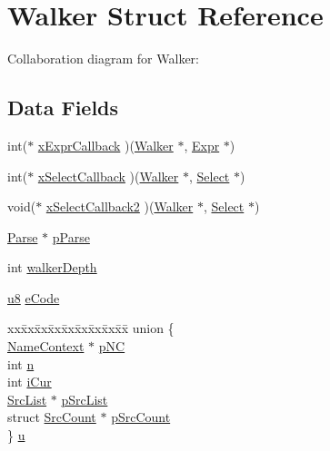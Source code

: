 \hypertarget{struct_walker}{}\section{Walker Struct Reference}
\label{struct_walker}


Collaboration diagram for Walker\+:
\subsection*{Data Fields}
\begin{DoxyCompactItemize}
\item 
int($\ast$ \hyperlink{struct_walker_adf159f38811f6fceaaec334f81ca930f}{x\+Expr\+Callback} )(\hyperlink{struct_walker}{Walker} $\ast$, \hyperlink{struct_expr}{Expr} $\ast$)
\item 
int($\ast$ \hyperlink{struct_walker_a0e113b69b77d7c738f56b35bfa223e3b}{x\+Select\+Callback} )(\hyperlink{struct_walker}{Walker} $\ast$, \hyperlink{struct_select}{Select} $\ast$)
\item 
void($\ast$ \hyperlink{struct_walker_af47ca3398892c8e1b77ecfec55854383}{x\+Select\+Callback2} )(\hyperlink{struct_walker}{Walker} $\ast$, \hyperlink{struct_select}{Select} $\ast$)
\item 
\hyperlink{struct_parse}{Parse} $\ast$ \hyperlink{struct_walker_ac700bf257b32cd7e491fde90a081379d}{p\+Parse}
\item 
int \hyperlink{struct_walker_a3408c16f995f9fbf7a7f0199b3e6658c}{walker\+Depth}
\item 
\hyperlink{sqlite3_8c_a74a0f6424ae628af25f23f0a35f6ead3}{u8} \hyperlink{struct_walker_a9722ca12532d3d55b851ac6f586c51a2}{e\+Code}
\item 
\begin{tabbing}
xx\=xx\=xx\=xx\=xx\=xx\=xx\=xx\=xx\=\kill
union \{\\
\>\hyperlink{struct_name_context}{NameContext} $\ast$ \hyperlink{struct_walker_ab8e4596de9a977e3a52462ae8d1f7b7a}{pNC}\\
\>int \hyperlink{struct_walker_a76f11d9a0a47b94f72c2d0e77fb32240}{n}\\
\>int \hyperlink{struct_walker_ad4234df4b7f768520fbd6a92a2b0023c}{iCur}\\
\>\hyperlink{struct_src_list}{SrcList} $\ast$ \hyperlink{struct_walker_afbf9e5f3766df361d597cbcaba479e1d}{pSrcList}\\
\>struct \hyperlink{struct_src_count}{SrcCount} $\ast$ \hyperlink{struct_walker_a5d5aea732b321028a8180029ddc6157c}{pSrcCount}\\
\} \hyperlink{struct_walker_a045a298b470ad98c35b51f7dbe60c0be}{u}\\

\end{tabbing}\end{DoxyCompactItemize}


